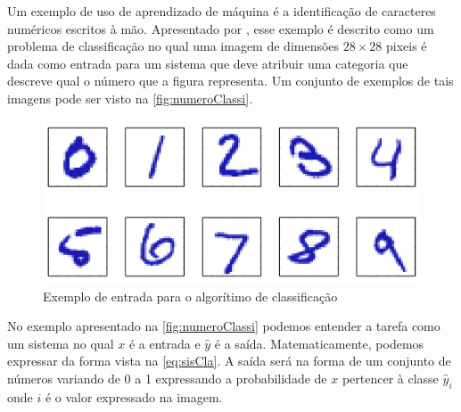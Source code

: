 \documentclass[
    12pt,
    oneside,
    a4paper,
    english,
    brazil
]{abntex2}
\begin{document}
Um exemplo de uso de aprendizado de máquina é a identificação de caracteres  numéricos escritos à mão. Apresentado por , esse exemplo é descrito como  um problema de  classificação no qual uma imagem  de dimensões $28 \times 28$ pixeis é dada como  entrada para um sistema que deve atribuir uma categoria que descreve qual o número que a figura representa.  Um conjunto de exemplos de tais imagens  pode ser  visto na \autoref{fig:numeroClassi}.

\begin{figure}
    \centering
    \caption{Exemplo de entrada para o algorítimo de
        classificação}\label{fig:numeroClassi}
    \includegraphics[width=.5\linewidth]{images/numeroClassificacao.png}
\end{figure}

No exemplo apresentado na \autoref{fig:numeroClassi} podemos entender a tarefa como um sistema no qual $x$  é a  entrada  e $\hat{y}$  é a  saída.
Matematicamente, podemos expressar da  forma vista  na \autoref{eq:sisCla}.  A saída será na forma  de um conjunto de números variando de 0  a 1 expressando a probabilidade  de  $x$ pertencer  à  classe  $\hat{y}_i$  onde  $i$ é o valor expressado na imagem.
\end{document}
